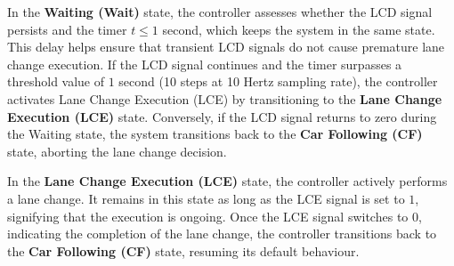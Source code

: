 In the \textbf{Waiting (Wait)} state, the controller assesses whether the LCD signal persists and the timer $t \leq 1$ second, which keeps the system in the same state. This delay helps ensure that transient LCD signals do not cause premature lane change execution. If the LCD signal continues and the timer surpasses a threshold value of $1$ second (10 steps at 10 Hertz sampling rate), the controller activates Lane Change Execution (LCE) by transitioning to the \textbf{Lane Change Execution (LCE)} state. Conversely, if the LCD signal returns to zero during the Waiting state, the system transitions back to the \textbf{Car Following (CF)} state, aborting the lane change decision.

In the \textbf{Lane Change Execution (LCE)} state, the controller actively performs a lane change. It remains in this state as long as the LCE signal is set to $1$, signifying that the execution is ongoing. Once the LCE signal switches to $0$, indicating the completion of the lane change, the controller transitions back to the \textbf{Car Following (CF)} state, resuming its default behaviour.


